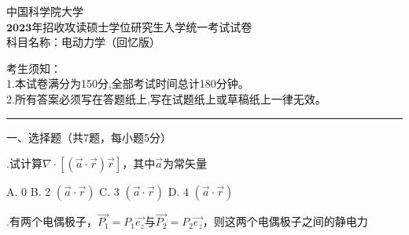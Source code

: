 \begin{center}
	\heiti
	\LARGE{ 中国科学院大学\\ $\boldsymbol{2023}$年招收攻读硕士学位研究生入学统一考试试卷\\
	科目名称：电动力学（回忆版）}

\end{center}
\noindent
考生须知：\\
1.本试卷满分为150分,全部考试时间总计180分钟。\\
2.所有答案必须写在答题纸上,写在试题纸上或草稿纸上一律无效。

\vspace*{2ex}
\hrule
\vspace*{4ex}


\setcounter{page}{1}%
\pagestyle{mypagestyle}

\onehalfspacing
\vspace{0.4cm}

\noindent
一、选择题（共7题，每小题5分）
\vspace{0.2cm}

.\hspace{0.8em}试计算$\nabla \cdot [ (\Vec{a} \cdot \Vec{r}) \Vec{r} ]$，其中$\Vec{a}$为常矢量
\vspace{0.3cm}

A.\hspace{0.8em} 0 \hspace{2em} B.\hspace{0.8em} 2 $(\Vec{a} \cdot \Vec{r})$ \hspace{2em} C.\hspace{0.8em} 3 $(\Vec{a} \cdot \Vec{r})$ \hspace{2em} D.\hspace{0.8em} 4 $(\Vec{a} \cdot \Vec{r})$
\vspace{0.5cm}

.\hspace{0.8em}有两个电偶极子，$\Vec{P_1} = P_1 \Vec{e_z}$与$\Vec{P_2} = P_2 \Vec{e_z}$，则这两个电偶极子之间的静电力
\vspace{0.3cm}

